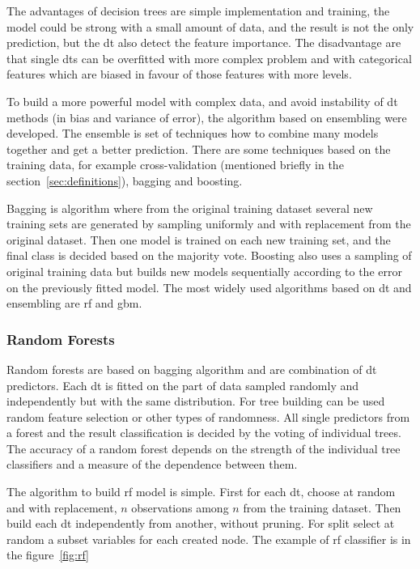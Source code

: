 \documentclass[thesis=M,english]{FITthesis}[2012/10/20]
\begin{document}
The advantages of decision trees are simple implementation and training, the model could be strong with a small amount of data, and the result is not the only prediction, but the \gls{dt} also detect the feature importance.  The disadvantage are that single \gls{dt}s can be overfitted with more complex problem and with categorical features which are biased in favour of those features with more levels.\cite{Deng2011dt}

To build a more powerful model with complex data, and avoid instability of \gls{dt} methods (in bias and variance of error), the algorithm based on ensembling were developed. The ensemble is set of techniques how to combine many models together and get a better prediction. There are some techniques based on the training data, for example cross-validation (mentioned briefly in the section~\ref{sec:definitions}), bagging and boosting.\cite[5--6]{Dietterich2000ensamble} 

Bagging is algorithm where from the original training dataset several new training sets are generated by sampling uniformly and with replacement from the original dataset. Then one model is trained on each new training set, and the final class is decided based on the majority vote. Boosting also uses a sampling of original training data but builds new models sequentially according to the error on the previously fitted model. The most widely used algorithms based on \gls{dt} and ensembling are \gls{rf} and \gls{gbm}.

\subsubsection{Random Forests}\label{sec:rf}

Random forests are based on bagging algorithm and are combination of \gls{dt} predictors. Each \gls{dt} is fitted on the part of data sampled randomly and independently but with the same distribution. For tree building can be used random feature selection or other types of randomness. All single predictors from a forest and the result classification is decided by the voting of individual trees. The accuracy of a random forest depends on the strength of the individual tree classifiers and a measure of the dependence between them.\cite[1--3]{Breiman2001rf} 

The algorithm to build \gls{rf} model is simple. First for each \gls{dt}, choose at random and with replacement, $n$ observations
among $n$ from the training dataset. Then build each \gls{dt} independently from another, without pruning. For split select at random a subset variables for each created node. The example of \gls{rf} classifier is in the figure~\ref{fig:rf}
\end{document}
